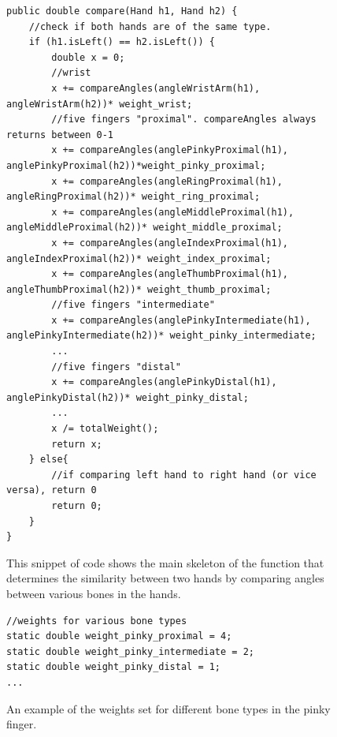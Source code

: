 \begin{figure}[H]
\centering
\begin{lstlisting}
public double compare(Hand h1, Hand h2) {
	//check if both hands are of the same type.
	if (h1.isLeft() == h2.isLeft()) {
		double x = 0;
		//wrist
		x += compareAngles(angleWristArm(h1), angleWristArm(h2))* weight_wrist;
		//five fingers "proximal". compareAngles always returns between 0-1
		x += compareAngles(anglePinkyProximal(h1), anglePinkyProximal(h2))*weight_pinky_proximal;
		x += compareAngles(angleRingProximal(h1), angleRingProximal(h2))* weight_ring_proximal;
		x += compareAngles(angleMiddleProximal(h1), angleMiddleProximal(h2))* weight_middle_proximal;
		x += compareAngles(angleIndexProximal(h1), angleIndexProximal(h2))* weight_index_proximal;
		x += compareAngles(angleThumbProximal(h1), angleThumbProximal(h2))* weight_thumb_proximal;
		//five fingers "intermediate"
		x += compareAngles(anglePinkyIntermediate(h1), anglePinkyIntermediate(h2))* weight_pinky_intermediate;
		...
		//five fingers "distal"
		x += compareAngles(anglePinkyDistal(h1), anglePinkyDistal(h2))* weight_pinky_distal;
		...
		x /= totalWeight();
		return x;
	} else{
		//if comparing left hand to right hand (or vice versa), return 0
		return 0; 
	}
}
\end{lstlisting}
\caption[Angular Comparison Function]{This snippet of code shows the main skeleton of the function that determines the similarity between two hands by comparing angles between various bones in the hands.}
\label{fig:compare1}
\end{figure}


\begin{figure}[H]
\centering
\begin{lstlisting}
//weights for various bone types 
static double weight_pinky_proximal = 4;
static double weight_pinky_intermediate = 2;
static double weight_pinky_distal = 1;
...
\end{lstlisting}
\caption[Bone Weights in Angular Comparison Function]{An example of the weights set for different bone types in the pinky finger.}
\label{fig:weights}
\end{figure}


